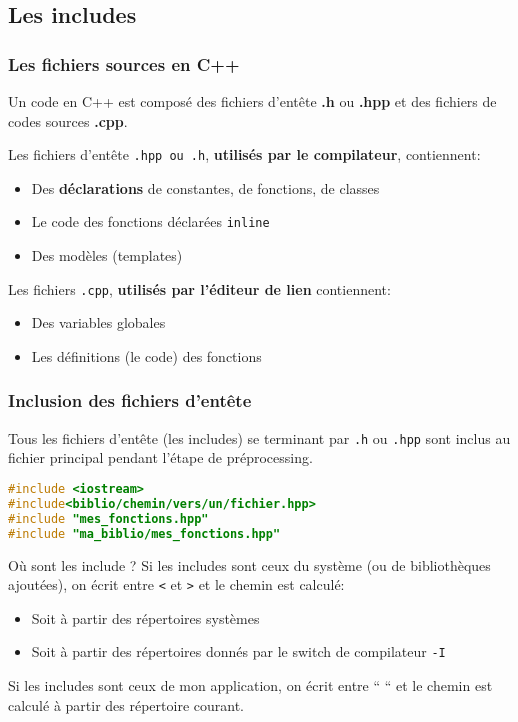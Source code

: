 \documentclass{beamer}
\begin{document}
\subsection{Les includes}

\begin{frame}[fragile=singleslide,shrink=20]
\frametitle {Les fichiers sources en C++}

Un code en C++ est composé des fichiers d'entête \textbf{.h} ou \textbf{.hpp} et des fichiers de codes sources \textbf{.cpp}. \\ \;

Les fichiers d'entête \texttt{.hpp ou .h}, \textbf{utilisés par le compilateur}, contiennent:
\begin{itemize}
\item{Des \textbf{déclarations} de constantes, de fonctions, de classes}
\item{Le code des fonctions déclarées \texttt{inline}}
\item{Des modèles (templates)}
\end{itemize} \;


Les fichiers \texttt{.cpp}, \textbf{utilisés par l'éditeur de lien} contiennent:
\begin{itemize}
\item{Des variables globales}
\item{Les définitions (le code) des fonctions}
\end{itemize}

\end{frame}


\begin{frame}[fragile=singleslide,shrink=20]
\frametitle {Inclusion des fichiers d'entête}

Tous les fichiers d'entête (les includes) se terminant par \texttt{.h} ou \texttt{.hpp} sont inclus au fichier principal pendant l'étape de préprocessing. 

\begin{lstlisting}[language=c++]
#include <iostream>
#include<biblio/chemin/vers/un/fichier.hpp>
#include "mes_fonctions.hpp"
#include "ma_biblio/mes_fonctions.hpp"
\end{lstlisting}

\begin{block}{Où sont les include ?}
Si les includes sont ceux du système (ou de bibliothèques ajoutées), on écrit entre \texttt{<} et \texttt{>}
et le chemin est calculé:

\begin{itemize}
\item{Soit à partir des répertoires systèmes}
\item{Soit à partir des répertoires donnés par le switch de compilateur \texttt{-I}}
\end{itemize}

Si les includes sont ceux de mon application, on écrit entre `` ``
et le chemin est calculé à partir des répertoire courant.
\end{block}

\end{frame}
\end{document}
